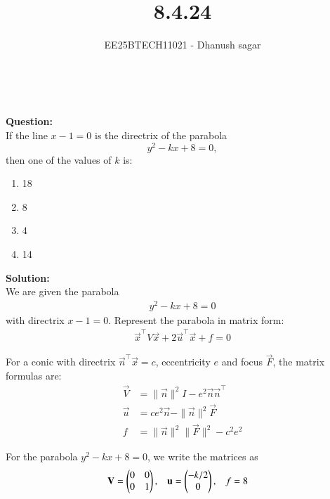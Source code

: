 \documentclass[journal]{IEEEtran}
\begin{document}


\title{8.4.24}
\author{EE25BTECH11021 - Dhanush sagar}
\maketitle \vspace{-1cm}
\renewcommand{\thefigure}{\theenumi}
\renewcommand{\thetable}{\theenumi}
\setlength{\intextsep}{10pt} %

\
\renewcommand{\thetable}{\theenumi}

\textbf{Question:}  \\
If the line $x - 1 = 0$ is the directrix of the parabola 
\[
y^2 - kx + 8 = 0,
\] 
then one of the values of $k$ is:
\begin{multicols}{4}
    \begin{enumerate}
    \item 18
    \item 8
    \item 4
    \item 14
\end{enumerate}
\end{multicols}

\textbf{Solution:}  \\
We are given the parabola 
\begin{align}
y^2 - kx + 8 = 0
\end{align}
with directrix \(x - 1 = 0\). Represent the parabola in matrix form:
\begin{align}
\vec{x}^\top V \vec{x} + 2 \vec{u}^\top \vec{x} + f = 0
\end{align}



For a conic with directrix \(\vec{n}^\top \vec{x} = c\), eccentricity \(e\) and focus \(\vec{F}\), the matrix formulas are:
\begin{align}
\vec{V} &= \|\vec{n}\|^2 I - e^2 \vec{n} \vec{n}^\top \\
\vec{u} &= c e^2 \vec{n} - \|\vec{n}\|^2 \vec{F} \\
f &= \|\vec{n}\|^2 \|\vec{F}\|^2 - c^2 e^2
\end{align}

For the parabola \(y^2 - kx + 8 = 0\), we write the matrices as
\begin{align}
\mathbf{V} &= \begin{pmatrix}0 & 0 \\ 0 & 1\end{pmatrix}, &
\mathbf{u} &= \begin{pmatrix}-k/2 \\ 0\end{pmatrix}, &
f &= 8
\end{align}
\end{document}
